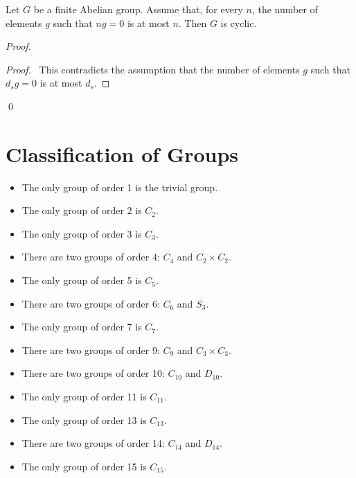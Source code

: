 \begin{lm}
\label{lm:ng-is-zero-cyclic}
Let $G$ be a finite Abelian group. Assume that, for every $n$, the number of elements $g$ such that $ng = 0$ is at most $n$. Then $G$ is cyclic.
\end{lm}

\begin{proof}
\pf
{}
\qedstep
\begin{proof}
	\pf\ This contradicts the assumption that the number of elements $g$ such that $d_s g = 0$ is at most $d_s$.
\end{proof}
\qed
\end{proof}

\chapter{Classification of Groups}

\begin{ex}
\begin{itemize}
\item The only group of order 1 is the trivial group.
\item The only group of order 2 is $C_2$.
\item The only group of order 3 is $C_3$.
\item There are two groups of order 4: $C_4$ and $C_2 \times C_2$.
\item The only group of order 5 is $C_5$.
\item There are two groups of order 6: $C_6$ and $S_3$.
\item The only group of order 7 is $C_7$.
\item There are two groups of order 9: $C_9$ and $C_3 \times C_3$.
\item There are two groups of order 10: $C_{10}$ and $D_{10}$.
\item The only group of order 11 is $C_{11}$.
\item The only group of order 13 is $C_{13}$.
\item There are two groups of order 14: $C_{14}$ and $D_{14}$.
\item The only group of order 15 is $C_{15}$.
\end{itemize}
\end{ex}

